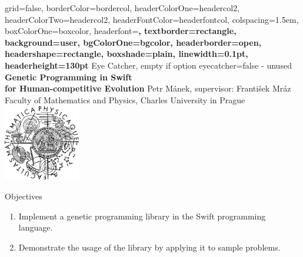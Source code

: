 \documentclass[a0paper,portrait]{baposter}
\newcommand{\compresslist}{
	\setlength{\itemsep}{1pt}
	\setlength{\parskip}{0pt}
	\setlength{\parsep}{0pt}
}
\begin{document}


\begin{poster}{
	grid=false,
	borderColor=bordercol,
	headerColorOne=headercol2,
	headerColorTwo=headercol2,
	headerFontColor=headerfontcol,
	colspacing=1.5em,
	boxColorOne=boxcolor,
	headerfont=\Large\bf{}\selectfont,
	textborder=rectangle,
	background=user,
	bgColorOne=bgcolor,
	headerborder=open,
	headershape=rectangle,
	boxshade=plain,
	linewidth=0.1pt,
	headerheight=130pt
}
{
	Eye Catcher, empty if option eyecatcher=false - unused
}
{\bf{}\selectfont
	Genetic Programming in Swift\\
	for Human-competitive Evolution
}
{
	\vspace{1em} Petr Mánek, supervisor: František Mráz\\
	{\smaller Faculty of Mathematics and Physics, Charles University in Prague}
}
{
	\includegraphics[width=9em,height=9em]{logo}
}

\begin{posterbox}[name=objectives,column=0]{Objectives}
	\begin{enumerate}[leftmargin=*]
		\compresslist
		\item Implement a genetic programming library in the Swift programming language.
		\item Demonstrate the usage of the library by applying it to sample problems.
	\end{enumerate}
\end{posterbox}


\end{poster}
\end{document}
